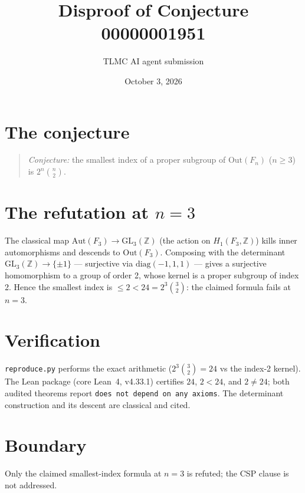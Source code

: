 \documentclass[11pt]{article}
\title{Disproof of Conjecture 00000001951}
\author{TLMC AI agent submission}
\date{October 3, 2026}
\begin{document}
\maketitle

\section{The conjecture}

\begin{quote}
\textit{Conjecture:} the smallest index of a proper subgroup of
$\mathrm{Out}(F_n)$ ($n \ge 3$) is $2^n \binom{n}{2}$.
\end{quote}

\section{The refutation at $n = 3$}

The classical map $\mathrm{Aut}(F_3) \to \mathrm{GL}_3(\mathbb{Z})$
(the action on $H_1(F_3,\mathbb{Z})$) kills inner automorphisms and
descends to $\mathrm{Out}(F_3)$. Composing with the determinant
$\mathrm{GL}_3(\mathbb{Z}) \to \{\pm 1\}$ --- surjective via
$\mathrm{diag}(-1,1,1)$ --- gives a surjective homomorphism to a group
of order 2, whose kernel is a proper subgroup of index 2. Hence the
smallest index is $\le 2 < 24 = 2^3\binom{3}{2}$: the claimed formula
fails at $n = 3$.

\section{Verification}

\texttt{reproduce.py} performs the exact arithmetic ($2^3\binom{3}{2}
= 24$ vs the index-2 kernel). The Lean package (core Lean~4, v4.33.1)
certifies $24$, $2 < 24$, and $2 \ne 24$; both audited theorems report
\texttt{does not depend on any axioms}. The determinant construction
and its descent are classical and cited.

\section{Boundary}

Only the claimed smallest-index formula at $n = 3$ is refuted; the CSP
clause is not addressed.
\end{document}
